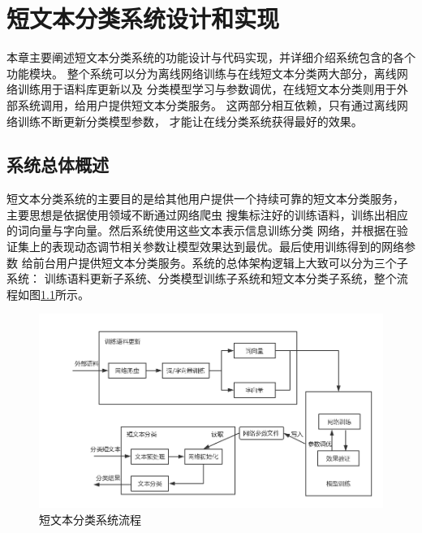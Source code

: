 \chapter{短文本分类系统设计和实现}
本章主要阐述短文本分类系统的功能设计与代码实现，并详细介绍系统包含的各个功能模块。
整个系统可以分为离线网络训练与在线短文本分类两大部分，离线网络训练用于语料库更新以及
分类模型学习与参数调优，在线短文本分类则用于外部系统调用，给用户提供短文本分类服务。
这两部分相互依赖，只有通过离线网络训练不断更新分类模型参数，
才能让在线分类系统获得最好的效果。
\section{系统总体概述}
短文本分类系统的主要目的是给其他用户提供一个持续可靠的短文本分类服务，
主要思想是依据使用领域不断通过网络爬虫
搜集标注好的训练语料，训练出相应的词向量与字向量。然后系统使用这些文本表示信息训练分类
网络，并根据在验证集上的表现动态调节相关参数让模型效果达到最优。最后使用训练得到的网络参数
给前台用户提供短文本分类服务。系统的总体架构逻辑上大致可以分为三个子系统：
训练语料更新子系统、分类模型训练子系统和短文本分类子系统，整个流程如图\ref{system_architecture}所示。
\begin{figure}[h]
    \includegraphics[scale=0.45]{picture/system_architecture.png}
    \caption{短文本分类系统流程}
    \label{system_architecture}
\end{figure}

